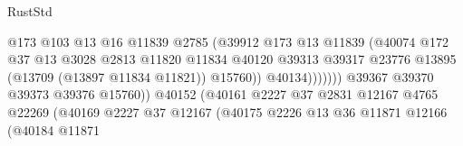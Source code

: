 \begin{lexlean}{RustStd}
\begin{coremodule}
                                                  @173
                                                  @103
                                                  @13
                                                  @16
                                                  @11839
                                                  @2785
                                                  (@39912
                                                    @173
                                                    @13
                                                    @11839
                                                    (@40074
                                                      @172
                                                      @37
                                                      @13
                                                      @3028
                                                      @2813
                                                      @11820
                                                      @11834
                                                      @40120
                                                      @39313
                                                      @39317
                                                      @23776
                                                      @13895
                                                      (@13709 (@13897 @11834 @11821))
                                                      @15760))
                                                  @40134)))))))
                                    @39367
                                    @39370
                                    @39373
                                    @39376
                                    @15760))
                                @40152
                                (@40161
                                  @2227
                                  @37
                                  @2831
                                  @12167
                                  @4765
                                  @22269
                                  (@40169
                                    @2227
                                    @37
                                    @12167
                                    (@40175
                                      @2226
                                      @13
                                      @36
                                      @11871
                                      @12166
                                      (@40184
                                        @11871

\end{coremodule}
\end{lexlean}
